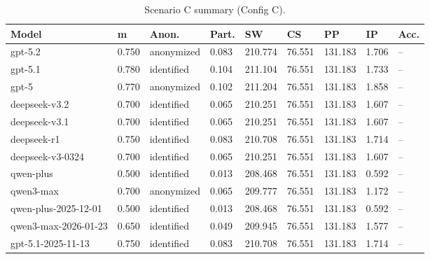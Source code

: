 \begin{table}[t]
  \centering
  \caption{Scenario C summary (Config C).}
  \label{tab:app_sc_c_C}
  \small
  \setlength{\tabcolsep}{4pt}
  \renewcommand{\arraystretch}{1.05}
  \begin{tabular}{p{3.2cm} p{1.6cm} p{1.4cm} p{1.2cm} p{1.25cm} p{1.25cm} p{1.25cm} p{1.25cm} p{1.05cm}}
    \toprule
    Model & m & Anon. & Part. & SW & CS & PP & IP & Acc. \\
    \midrule
    gpt-5.2 & 0.750 & anonymized & 0.083 & 210.774 & 76.551 & 131.183 & 1.706 & -- \\
    gpt-5.1 & 0.780 & identified & 0.104 & 211.104 & 76.551 & 131.183 & 1.733 & -- \\
    gpt-5 & 0.770 & anonymized & 0.102 & 211.204 & 76.551 & 131.183 & 1.858 & -- \\
    deepseek-v3.2 & 0.700 & identified & 0.065 & 210.251 & 76.551 & 131.183 & 1.607 & -- \\
    deepseek-v3.1 & 0.700 & identified & 0.065 & 210.251 & 76.551 & 131.183 & 1.607 & -- \\
    deepseek-r1 & 0.750 & identified & 0.083 & 210.708 & 76.551 & 131.183 & 1.714 & -- \\
    deepseek-v3-0324 & 0.700 & identified & 0.065 & 210.251 & 76.551 & 131.183 & 1.607 & -- \\
    qwen-plus & 0.500 & identified & 0.013 & 208.468 & 76.551 & 131.183 & 0.592 & -- \\
    qwen3-max & 0.700 & anonymized & 0.065 & 209.777 & 76.551 & 131.183 & 1.172 & -- \\
    qwen-plus-2025-12-01 & 0.500 & identified & 0.013 & 208.468 & 76.551 & 131.183 & 0.592 & -- \\
    qwen3-max-2026-01-23 & 0.650 & identified & 0.049 & 209.945 & 76.551 & 131.183 & 1.577 & -- \\
    gpt-5.1-2025-11-13 & 0.750 & identified & 0.083 & 210.708 & 76.551 & 131.183 & 1.714 & -- \\
    \bottomrule
  \end{tabular}
\end{table}

